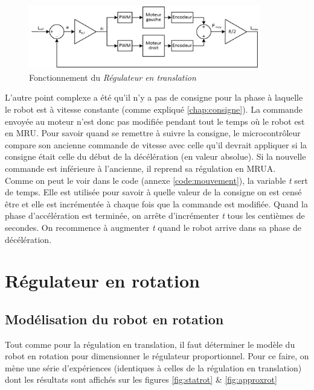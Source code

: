\begin{figure}[H]
    \centering
    \includegraphics[width=0.9\textwidth]{Pictures/regul_trans.png}
    \caption{Fonctionnement du \textit{Régulateur en translation}}
    \label{fig:regulateur_translation}
\end{figure}

L'autre point complexe a été qu'il n'y a pas de consigne pour la phase à laquelle le robot est à vitesse constante (comme expliqué \ref{chap:consigne}). La commande envoyée au moteur n'est donc pas modifiée pendant tout le temps où le robot est en MRU. Pour savoir quand se remettre à suivre la consigne, le microcontrôleur compare son ancienne commande de vitesse avec celle qu'il devrait appliquer si la consigne était celle du début de la décélération (en valeur absolue). Si la nouvelle commande est inférieure à l'ancienne, il reprend sa régulation en MRUA.\\
Comme on peut le voir dans le code (annexe \ref{code:mouvement}), la variable \textit{t} sert de temps. Elle est utilisée pour savoir à quelle valeur de la consigne on est censé être et elle est incrémentée à chaque fois que la commande est modifiée. Quand la phase d'accélération est terminée, on arrête d'incrémenter \textit{t} tous les centièmes de secondes. On recommence à augmenter \textit{t} quand le robot arrive dans sa phase de décélération.

\section{Régulateur en rotation}

\subsection{Modélisation du robot en rotation}

Tout comme pour la régulation en translation, il faut déterminer le modèle du robot en rotation pour dimensionner le régulateur proportionnel. Pour ce faire, on mène une série d'expériences (identiques à celles de la régulation en translation) dont les résultats sont affichés sur les figures \ref{fig:statrot} \& \ref{fig:approxrot}


